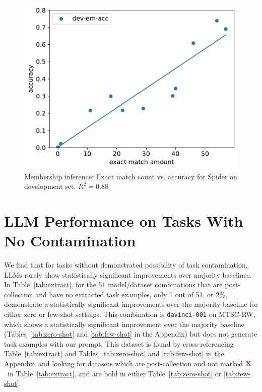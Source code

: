 \documentclass[letterpaper]{article} %
\newcommand{\redx}{$\color{red}\textbf{X}$}
\begin{document}
\begin{figure}[t!]
          \centering
            \includegraphics[scale=0.5]{img/dev-acc-em.pdf}
    \caption[]%
            {Membership inference: Exact match count vs. accuracy for Spider on development set. $R^2=0.88$}
            \label{fig:dev-acc-em}
\end{figure}

\section{LLM Performance on Tasks With No Contamination}
\label{sec:no_contamination}

We find that for tasks without demonstrated possibility of task contamination, LLMs rarely show statistically significant improvements over majority baselines. In Table~\ref{tab:extract}, for the $51$ model/dataset combinations that are post-collection and have no extracted task examples, only 1 out of 51, or $2\%$, demonstrate a statistically significant improvements over the majority baseline for either zero or few-shot settings.  This combination is \texttt{davinci-001} on MTSC-RW, which shows a statistically significant improvement over the majority baseline (Tables~\ref{tab:zero-shot} and \ref{tab:few-shot} in the Appendix) but does not generate task examples with our prompt.  This dataset is found by cross-referencing Table~\ref{tab:extract} and Tables~\ref{tab:zero-shot} and \ref{tab:few-shot} in the Appendix, and looking for datasets which are post-collection and not marked \redx~in Table~\ref{tab:extract}, and are bold in either Table~\ref{tab:zero-shot} or \ref{tab:few-shot}.
\end{document}
